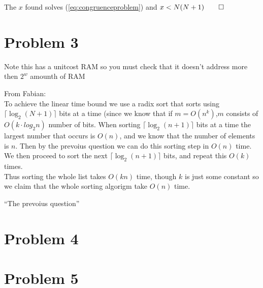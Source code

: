 \documentclass[a4paper,twoside=false,abstract=false,numbers=noenddot,
titlepage=false,headings=small,parskip=half,version=last]{scrartcl}
\begin{document}
The $x$ found solves (\ref{eq:congruenceproblem}) and $x<N(N+1) \qed$


\section{Problem 3}

Note this has a unitcost RAM so you must check that it doesn't address more then $2^w$ amounth of RAM

From Fabian:\\

To achieve the linear time bound we use a radix sort that sorts using $\lceil{\log_2(N+1)}\rceil$ bits at a time 
(since we know that if $m = O(n^k)$,$m$ consists of $O(k\cdot log_2{n})$ number of bits.
When sorting $\lceil\log_2{(n+1)}\rceil$ bits at a time the largest number that occurs is $O(n)$, 
and we know that the number of elements is $n$.
Then by the prevoius question we can do this sorting step in $O(n)$ time. We then proceed to sort the next $\lceil\log_2{(n+1)}\rceil$ bits, and
repeat this $O(k)$ times.\\
Thus sorting the whole list takes $O(kn)$ time, though $k$ is just some constant so we claim that the whole sorting algorigm take $O(n)$ time.

``The prevoius question''



\section{Problem 4}

\section{Problem 5}
\end{document}
